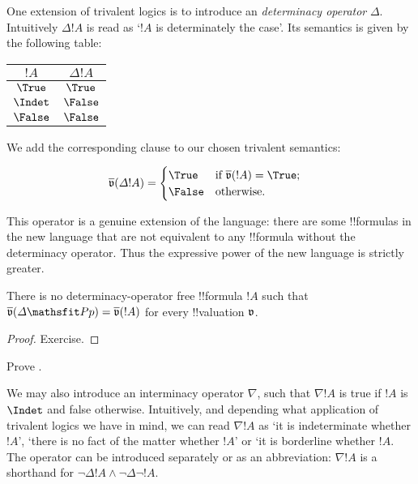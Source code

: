 \documentclass[../../../include/open-logic-section]{subfiles}
\begin{document}


One extension of trivalent logics is to introduce an \emph{determinacy operator} $\Delta$. Intuitively $\Delta !A$ is read as `$!A$ is determinately the case'. Its semantics is given by the following table:

\begin{center}
  \begin{tabular}{|c||c|} \hline 
    $!A$ & $ \Delta !A$ \\ 
    \hline \hline 
    $\True$ & $\True$ \\ 
    $\Indet$ & $\False$ \\
    $\False$ & $\False$ \\ 
    \hline 
  \end{tabular}
\end{center}

We add the corresponding clause to our chosen trivalent semantics:

\begin{defn}
  \begin{align*}
    \pValue{v}(\Delta !A) & = \begin{cases}
        \True & \text{if $\pValue{v}(!A) = \True$;}\\ 
        \False & \text{otherwise.} 
    \end{cases}
\end{align*}
\end{defn}

This operator is a genuine extension of the language: there are some !!{formula}s in the new language that are not equivalent to any !!{formula} without the determinacy operator. Thus the expressive power of the new language is strictly greater.

\begin{prop}
There is no determinacy-operator free !!{formula} $!A$ such that $\pValue{v}(\Delta \Obj{P
p}) = \pValue{v}(!A)$ for every !!{valuation} $\pAssign{v}$.
\end{prop}

\begin{proof}
Exercise.
\end{proof}

\begin{prob}
Prove .
\end{prob}

We may also introduce an interminacy operator $\nabla$, such that $\nabla !A$ is true if $!A$ is $\Indet$ and false otherwise. Intuitively, and depending what application of trivalent logics we have in mind, we can read $\nabla !A$ as `it is indeterminate whether $!A$', `there is no fact of the matter whether $!A$' or `it is borderline whether $!A$. The operator can be introduced separately or as an abbreviation: $\nabla !A$ is a shorthand for $\lnot \Delta !A \land \lnot \Delta \lnot !A$. 
\end{document}
